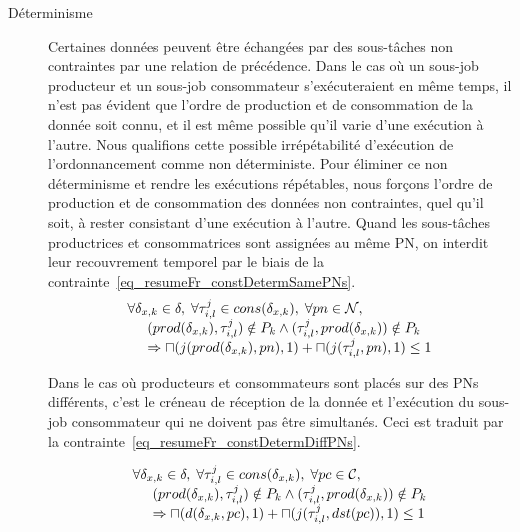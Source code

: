 \documentclass[main.tex]{subfiles}
\begin{document}
\begin{description}
    \item[Déterminisme]
        Certaines données peuvent être échangées par des sous-tâches non contraintes par une relation de précédence. Dans le cas où un sous-job producteur et un sous-job consommateur s'exécuteraient en même temps, il n'est pas évident que l'ordre de production et de consommation de la donnée soit connu, et il est même possible qu'il varie d'une exécution à l'autre. Nous qualifions cette possible irrépétabilité d'exécution de l'ordonnancement comme non déterministe. Pour éliminer ce non déterminisme et rendre les exécutions répétables, nous forçons l'ordre de production et de consommation des données non contraintes, quel qu'il soit, à rester consistant d'une exécution à l'autre. Quand les sous-tâches productrices et consommatrices sont assignées au même PN, on interdit leur recouvrement temporel par le biais de la contrainte~\ref{eq_resumeFr_constDetermSamePNs}.
\begin{equation}
    \label{eq_resumeFr_constDetermSamePNs}
    \begin{array}{l}
        \forall \delta_{x,k} \in \delta , \; \forall \tau_{i,l}^j \in cons( \delta_{x,k} ), \; \forall pn \in \mathcal{N}, \\
        \hspace{5mm} ( prod(\delta_{x,k}), \tau_{i,l}^j ) \notin P_k \land (\tau_{i,l}^j, prod(\delta_{x,k})) \notin P_k \\
        \hspace{5mm} \Rightarrow \sqcap ( j(prod(\delta_{x,k}), pn) ,1) + \sqcap ( j(\tau_{i,l}^j, pn) ,1) \leq 1
    \end{array}
\end{equation}

Dans le cas où producteurs et consommateurs sont placés sur des PNs différents, c'est le créneau de réception de la donnée et l'exécution du sous-job consommateur qui ne doivent pas être simultanés. Ceci est traduit par la contrainte~\ref{eq_resumeFr_constDetermDiffPNs}.

\begin{equation}
    \label{eq_resumeFr_constDetermDiffPNs}
    \begin{array}{l}
        \forall \delta_{x,k} \in \delta ,\; \forall \tau_{i,l}^j \in cons( \delta_{x,k} ), \; \forall pc \in \mathcal{C}, \\
        \hspace{5mm} ( prod(\delta_{x,k}), \tau_{i,l}^j ) \notin P_k \land (\tau_{i,l}^j, prod(\delta_{x,k})) \notin P_k \\
        \hspace{5mm} \Rightarrow \sqcap ( d(\delta_{x,k}, pc) ,1) + \sqcap ( j(\tau_{i,l}^j, dst(pc)) ,1) \leq 1
    \end{array}
\end{equation}

        
\end{description}
\end{document}
